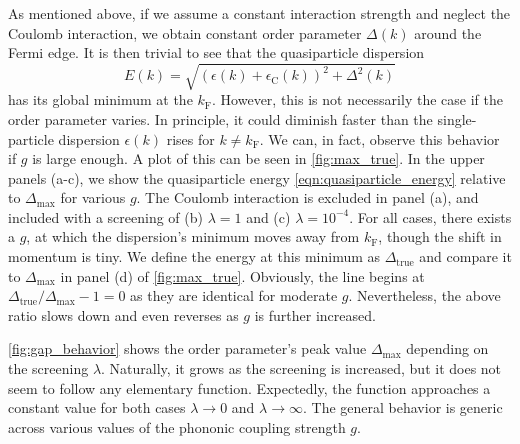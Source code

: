 \documentclass[
    reprint, 
    aps,
    preprintnumbers,
    twocolumn,
    prb,
    superscriptaddress
]{revtex4-2}
\newcommand{\kf}{k_{\mathrm{F}}}
\newcommand{\maxGap}{\Delta_\mathrm{max}}
\newcommand{\trueGap}{\Delta_\mathrm{true}}
\begin{document}
As mentioned above, if we assume a constant interaction strength and neglect the Coulomb interaction,
we obtain constant order parameter $\Delta (k)$ around the Fermi edge.
It is then trivial to see that the quasiparticle dispersion
\begin{equation}
  \label{eqn:quasiparticle_energy}
  E(k) = \sqrt{ (\epsilon(k) + \epsilon_\mathrm{C}(k))^2 + \Delta^2 (k) }
\end{equation}
has its global minimum at the $\kf$.
However, this is not necessarily the case if the order parameter varies.
In principle, it could diminish faster than the single-particle dispersion $\epsilon(k)$ rises for $k\neq \kf$.
We can, in fact, observe this behavior if $g$ is large enough.
A plot of this can be seen in \autoref{fig:max_true}. In the upper panels (a-c), we show the quasiparticle energy \eqref{eqn:quasiparticle_energy} relative to $\maxGap$ for various $g$.
The Coulomb interaction is excluded in panel (a), and included with a screening of (b) $\lambda=1$ and (c) $\lambda=10^{-4}$.
For all cases, there exists a $g$, at which the dispersion's minimum moves away from $\kf$, though the shift in momentum is tiny.
We define the energy at this minimum as $\trueGap$ and compare it to $\maxGap$ in panel (d) of \autoref{fig:max_true}.
Obviously, the line begins at $\trueGap / \maxGap - 1 = 0$ as they are identical for moderate $g$.
Nevertheless, the above ratio slows down and even reverses as $g$ is further increased.

\autoref{fig:gap_behavior} shows the order parameter's peak value $\maxGap$ depending on the screening $\lambda$.
Naturally, it grows as the screening is increased, but it does not seem to follow any elementary function.
Expectedly, the function approaches a constant value for both cases $\lambda \to 0$ and $\lambda \to \infty$.
The general behavior is generic across various values of the phononic coupling strength $g$.




\end{document}
